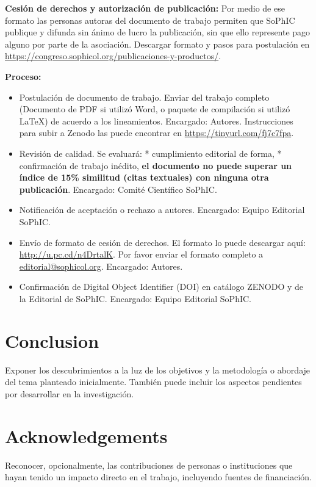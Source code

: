 \documentclass{sophicart}
\begin{document}
\textbf{Cesión de derechos y autorización de publicación:} Por medio de ese formato las personas autoras del documento de trabajo permiten que SoPhIC publique y difunda sin ánimo de lucro la publicación, sin que ello represente pago alguno por parte de la asociación. Descargar formato y pasos para postulación en \url{https://congreso.sophicol.org/publicaciones-y-productos/}. 

\textbf{Proceso:}

\begin{itemize}
\item Postulación de documento de trabajo. Enviar del trabajo completo (Documento de PDF si utilizó Word, o paquete de compilación si utilizó \LaTeX\xspace) de acuerdo a los lineamientos. Encargado: Autores. Instrucciones para subir a Zenodo las puede encontrar en \url{https://tinyurl.com/fj7c7fpa}.
\item Revisión de calidad. Se evaluará: * cumplimiento editorial de forma, * confirmación de trabajo inédito, \textbf{el documento no puede superar un índice de 15\% similitud (citas textuales) con ninguna otra publicación}. Encargado: Comité Científico SoPhIC. 
\item  Notificación de aceptación o rechazo a autores. Encargado: Equipo Editorial SoPhIC. 
\item  Envío de formato de cesión de derechos. El formato lo puede descargar aquí: \url{http://u.pc.cd/n4DrtalK}. Por favor enviar el formato completo a \href{mailto:editorial@sophicol.org}{editorial@sophicol.org}. Encargado: Autores.
\item  Confirmación de Digital Object Identifier (DOI) en catálogo ZENODO y de la Editorial de SoPhIC. Encargado: Equipo Editorial SoPhIC. 
\end{itemize}

\section{Conclusion}
Exponer los descubrimientos a la luz de los objetivos y la metodología o abordaje del tema planteado inicialmente. También puede incluir los aspectos pendientes por desarrollar en la investigación. 

\section{Acknowledgements}
Reconocer, opcionalmente, las contribuciones de personas o instituciones que hayan tenido un impacto directo en el trabajo, incluyendo fuentes de financiación. 

\printbibliography %
\end{document}
